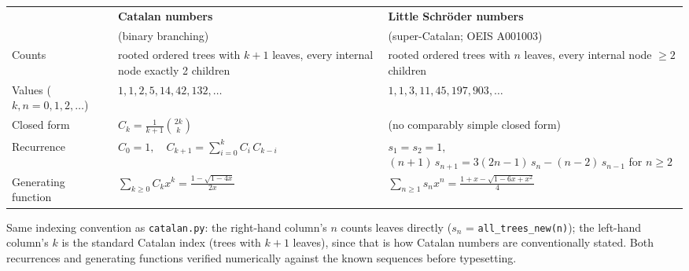 \parbox{15.6cm}{
\renewcommand{\arraystretch}{1.9}
\begin{tabular}{@{}l l l@{}}
\hline
 & \textbf{Catalan numbers} & \textbf{Little Schr\"oder numbers} \\
 & (binary branching) & (super-Catalan; OEIS A001003) \\
\hline
Counts &
  \parbox[t]{5.6cm}{\raggedright rooted ordered trees with $k{+}1$ leaves, every internal node exactly 2 children} &
  \parbox[t]{6.6cm}{\raggedright rooted ordered trees with $n$ leaves, every internal node $\geq 2$ children} \\[0.6em]
Values ($k,n{=}0,1,2,\dots$) &
  $1, 1, 2, 5, 14, 42, 132, \dots$ &
  $1, 1, 3, 11, 45, 197, 903, \dots$ \\[0.6em]
Closed form &
  $\displaystyle C_k = \frac{1}{k+1}\binom{2k}{k}$ &
  \parbox[t]{6.6cm}{\raggedright (no comparably simple closed form)} \\[1em]
Recurrence &
  \parbox[t]{5.6cm}{$\displaystyle C_0 = 1,\quad C_{k+1} = \sum_{i=0}^{k} C_i\, C_{k-i}$} &
  \parbox[t]{6.6cm}{$s_1 = s_2 = 1,$\\[0.3em] $\displaystyle (n{+}1)\,s_{n+1} = 3(2n{-}1)\,s_n - (n{-}2)\,s_{n-1}$ \\[0.2em] \footnotesize for $n \geq 2$} \\[1.4em]
Generating function &
  \parbox[t]{5.6cm}{$\displaystyle \sum_{k\geq 0} C_k x^k = \frac{1-\sqrt{1-4x}}{2x}$} &
  \parbox[t]{6.6cm}{$\displaystyle \sum_{n\geq 1} s_n x^n = \frac{1+x-\sqrt{1-6x+x^2}}{4}$} \\[1em]
\hline
\end{tabular}

\vspace{0.8em}

{\footnotesize\raggedright
Same indexing convention as \texttt{catalan.py}: the right-hand column's $n$ counts leaves
directly ($s_n$ = \texttt{all\_trees\_new(n)}); the left-hand column's $k$ is the standard
Catalan index (trees with $k{+}1$ leaves), since that is how Catalan numbers are conventionally
stated. Both recurrences and generating functions verified numerically against the known
sequences before typesetting.\par}
}

